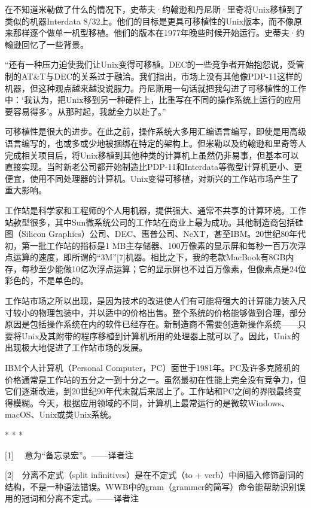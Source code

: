 \documentclass[a4paper,12pt,UTF8,twoside]{ctexbook}
\begin{document}
在不知道米勒做了什么的情况下，史蒂夫·约翰逊和丹尼斯·里奇将Unix移植到了类似的机器Interdata 8/32上。他们的目标是更具可移植性的Unix版本，而不像原来那样逐个做单一机型移植。他们的版本在1977年晚些时候开始运行。史蒂夫·约翰逊回忆了一些背景。

“还有一种压力迫使我们让Unix变得可移植。DEC的一些竞争者开始抱怨说，受管制的AT\&T与DEC的关系过于融洽。我们指出，市场上没有其他像PDP-11这样的机器，但这种观点越来越没说服力。丹尼斯用一句话就把我勾进了可移植性的工作中：‘我认为，把Unix移到另一种硬件上，比重写在不同的操作系统上运行的应用要容易得多’。从那时起，我就全力以赴了。”



可移植性是很大的进步。在此之前，操作系统大多用汇编语言编写，即使是用高级语言编写的，也或多或少地被捆绑在特定的架构上。但米勒以及约翰逊和里奇等人完成相关项目后，将Unix移植到其他种类的计算机上虽然仍非易事，但基本可以直接实现。当时新老公司都开始制造比PDP-11和Interdata等微型计算机更小、更便宜，使用不同处理器的计算机。Unix变得可移植，对新兴的工作站市场产生了重大影响。

工作站是科学家和工程师的个人用机器，提供强大、通常不共享的计算环境。工作站款型很多，其中Sun微系统公司的工作站在商业上最为成功。其他制造商包括硅图（Silicon Graphics）公司、DEC、惠普公司、NeXT，甚至IBM。20世纪80年代初，第一批工作站的指标是1 MB主存储器、100万像素的显示屏和每秒一百万次浮点运算的速度，即所谓的“3M”[7]机器。相比之下，我的老款MacBook有8GB内存，每秒至少能做10亿次浮点运算；它的显示屏也不过百万像素，但像素点是24位彩色的，不是单色的。

工作站市场之所以出现，是因为技术的改进使人们有可能将强大的计算能力装入尺寸较小的物理包装中，并以适中的价格出售。整个系统的价格能够做到合理，部分原因是包括操作系统在内的软件已经存在。新制造商不需要创造新操作系统——只要将Unix及其附带的程序移植到计算机所用的处理器上就可以了。因此，Unix的出现极大地促进了工作站市场的发展。

IBM个人计算机（Personal Computer，PC）面世于1981年。PC及许多克隆机的价格通常是工作站的五分之一到十分之一。虽然最初在性能上完全没有竞争力，但它们逐渐改进，到20世纪90年代末就后来居上了。工作站和PC之间的界限最终变得模糊。今天，根据应用领域的不同，计算机上最常运行的是微软Windows、macOS、Unix或类Unix系统。



* * *



[1]　 意为“备忘录宏”。——译者注

[2]　分离不定式（split infinitives）是在不定式（to + verb）中间插入修饰副词的结构，不是一种语法错误。WWB中的gram（grammer的简写）命令能帮助识别误用的冠词和分离不定式。——译者注
\end{document}

